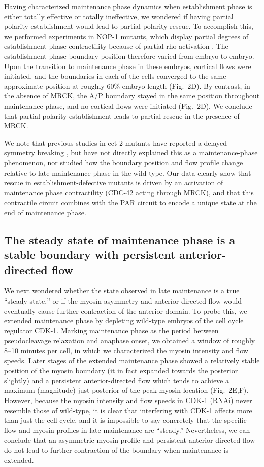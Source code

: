 \documentclass[11pt]{article}
\newcommand{\6}[1]{#1_{\text{6}}}
\newcommand{\3}[1]{#1_{\text{3}}}
\begin{document}
Having characterized maintenance phase dynamics when establishment phase is either totally effective or totally ineffective, we wondered if having partial polarity establishment would lead to partial polarity rescue. To accomplish this, we performed experiments in NOP-1 mutants, which display partial degrees of establishment-phase contractility because of partial rho activation \citep{tse2012rhoa}. The establishment phase boundary position therefore varied from embryo to embryo. Upon the transition to maintenance phase in these embryos, cortical flows were initiated, and the boundaries in each of the cells converged to the same approximate position at roughly 60\% embryo length (Fig.\ 2D). By contrast, in the absence of MRCK, the A/P boundary stayed in the same position throughout maintenance phase, and no cortical flows were initiated (Fig.\ 2D). We conclude that partial polarity establishment leads to partial rescue in the presence of MRCK. 

We note that previous studies in ect-2 mutants have reported a delayed symmetry breaking \citep{zonies2010symmetry, tse2012rhoa}, but have not directly explained this as a maintenance-phase phenomenon, nor studied how the boundary position and flow profile change relative to late maintenance phase in the wild type. Our data clearly show that rescue in establishment-defective mutants is driven by an activation of maintenance phase contractility (CDC-42 acting through MRCK), and that this contractile circuit combines with the PAR circuit to encode a unique state at the end of maintenance phase.

\subsection*{The steady state of maintenance phase is a stable boundary with persistent anterior-directed flow}
We next wondered whether the state observed in late maintenance is a true ``steady state,'' or if the myosin asymmetry and anterior-directed flow would eventually cause further contraction of the anterior domain. To probe this, we extended maintenance phase by depleting wild-type embryos of the cell cycle regulator CDK-1. Marking maintenance phase as the period between pseudocleavage relaxation and anaphase onset, we obtained a window of roughly 8--10 minutes per cell, in which we characterized the myosin intensity and flow speeds. Later stages of the extended maintenance phase showed a relatively stable position of the myosin boundary (it in fact expanded towards the posterior slightly) and a persistent anterior-directed flow which tends to achieve a maximum (magnitude) just posterior of the peak myosin location (Fig.\ 2E,F). However, because the myosin intensity and flow speeds in CDK-1 (RNAi) never resemble those of wild-type, it is clear that interfering with CDK-1 affects more than just the cell cycle, and it is impossible to say concretely that the specific flow and myosin profiles in late maintenance are ``steady.'' Nevertheless, we can conclude that an asymmetric myosin profile and persistent anterior-directed flow do not lead to further contraction of the boundary when maintenance is extended.
\end{document}
